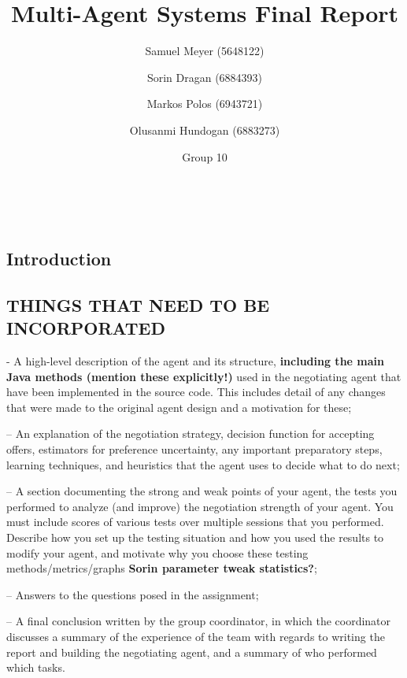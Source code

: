 \documentclass[a4paper,11pt]{article}
\makeatletter
\theoremstyle{mytheor}
\renewcommand{\maketitle}{
\begin{center}
\vspace{2ex}
{\huge \textsc{\@title}}
\vspace{1ex}
\\
\begin{center}
\@author
\end{center}
\end{center}
}
\makeatother
\begin{document}
\title{Multi-Agent Systems Final Report}

\author{Samuel Meyer (5648122) \and Sorin Dragan (6884393) \and Markos Polos (6943721) \and Olusanmi Hundogan (6883273) \and Group 10}

\maketitle
\hline

\subsection{Introduction}

\subsection{THINGS THAT NEED TO BE INCORPORATED}
- A high-level description of the agent and its structure, \textbf{including the main Java methods (mention these explicitly!)} used in the negotiating agent that have been implemented in the source
code. This includes detail of any changes that were made to the original agent design and a motivation for these;\newline

– An explanation of the negotiation strategy, decision function for accepting offers, estimators
for preference uncertainty, any important preparatory steps, learning techniques, and heuristics
that the agent uses to decide what to do next;\newline

– A section documenting the strong and weak points of your agent, the tests you performed
to analyze (and improve) the negotiation strength of your agent. You must include scores of
various tests over multiple sessions that you performed. Describe how you set up the testing
situation and how you used the results to modify your agent, and motivate why you choose
these testing methods/metrics/graphs \textbf{Sorin parameter tweak statistics?};\newline

– Answers to the questions posed in the assignment;\newline

– A final conclusion written by the group coordinator, in which the coordinator discusses a summary of the experience of the team with regards to writing the report and building the negotiating agent, and a summary of who performed which tasks.\newline
\end{document}
